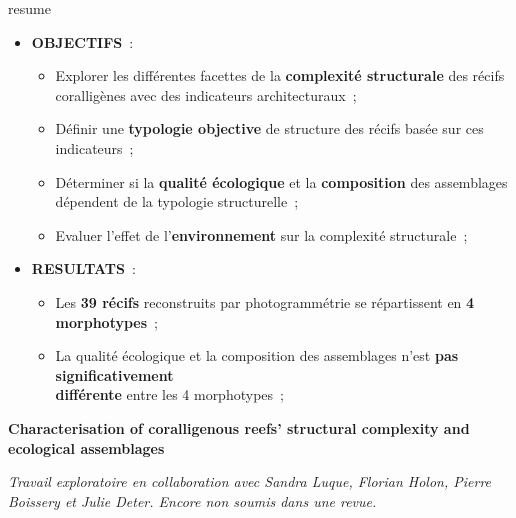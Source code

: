 \setlength{\fboxsep}{8pt}
\setlength{\fboxrule}{0pt}
\begin{center}
\begin{colbox}{resume}
  \vspace{-2pt}
{\color{textresume}\small
\begin{itemize}[leftmargin=0in]\itemsep3pt
\item \textbf{OBJECTIFS}~:
    \begin{itemize}
      \item Explorer les différentes facettes de la \textbf{complexité structurale} des récifs coralligènes avec des indicateurs architecturaux~;
      \item Définir une \textbf{typologie objective} de structure des récifs basée sur ces indicateurs~;
      \item Déterminer si la \textbf{qualité écologique} et la \textbf{composition} des assemblages dépendent de la typologie structurelle~;
      \item Evaluer l'effet de l'\textbf{environnement} sur la complexité structurale~;
    \end{itemize}
\item \textbf{RESULTATS}~:
    \begin{itemize}
      \item Les \textbf{39 récifs} reconstruits par photogrammétrie se répartissent en \textbf{4 morphotypes}~;
      \item La qualité écologique et la composition des assemblages n'est \textbf{pas significativement\\ différente} entre les 4 morphotypes~;
    \end{itemize}
\end{itemize}
}
\vspace{-2pt}
\end{colbox}
\end{center}

\clearpage

\fontsize{14}{14}\noindent\textbf{Characterisation of coralligenous reefs’ structural complexity and \\ecological assemblages}

\normalsize
\medskip

\noindent\textit{Travail exploratoire en collaboration avec Sandra Luque, Florian Holon, Pierre Boissery et Julie Deter. Encore non soumis dans une revue.}

\medskip


